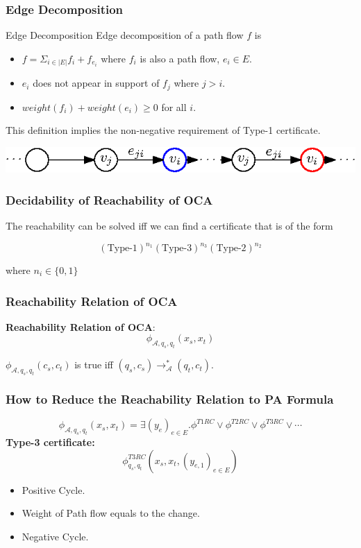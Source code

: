 \documentclass[11pt]{beamer}
\begin{document}
\begin{frame}\frametitle{Edge Decomposition}

\begin{definition}{Edge Decomposition}
Edge decomposition of a path flow $f$ is 
\begin{itemize}
\pause
\item $f = \Sigma_{i\in |E|} f_{i} + f_{e_i}$ where $f_{i}$ is also a path flow, $e_i\in E$.
\pause
\item $e_i$ does not appear in support of $f_{j}$ where $j > i$.
\pause
\item $weight(f_{i}) + weight(e_i) \ge 0$ for all $i$.
\end{itemize}

\end{definition}
\pause

This definition implies the non-negative requirement of Type-1 certificate.
\begin{center}
\includegraphics[scale=1.2]{edgeDecom.eps}
\end{center}
\end{frame}

\begin{frame}\frametitle{Decidability of Reachability of OCA}
\begin{theorem}[Haase]
The reachability can be solved iff we can find a certificate that is of the form

\[(\text{Type-1})^{n_1}(\text{Type-3})^{n_3}(\text{Type-2})^{n_2}\]

where $n_i\in \{0,1\}$
\end{theorem}
\end{frame}


\begin{frame}\frametitle{Reachability Relation of OCA}

\textbf{Reachability Relation of OCA}: 
\[\phi_{{\mathcal{A}}, q_s, q_t}(x_s, x_t)\]


$\phi_{{\mathcal{A}}, q_s, q_t}(c_s, c_t)$ is true iff $(q_s, c_s)\rightarrow^*_{\mathcal{A}} (q_t, c_t)$.
\end{frame}


	

\begin{frame}\frametitle{How to Reduce the Reachability Relation to PA Formula}
\[\phi_{{\mathcal{A}}, q_s, q_t}(x_s, x_t) =\exists (y_e)_{e\in E}. \phi^{T1RC} \vee \phi^{T2RC} \vee \phi^{T3RC} \vee \cdots \]
\textbf{Type-3 certificate:}
\[\phi^{T3RC}_{q_s, q_t}(x_s, x_t, (y_{e,1})_{e\in E}) \]
\begin{itemize}
\item Positive Cycle.
\item Weight of Path flow equals to the change.
\item Negative Cycle.
\end{itemize}
\end{frame}
\end{document}
